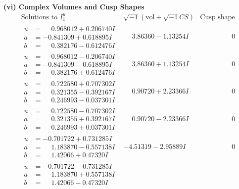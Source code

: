 \documentclass[1p]{elsarticle_modified}
\theoremstyle{definition}
\newcommand{\I}{\sqrt{-1}}
\begin{document}
\newpage\flushleft \textbf{(vi) Complex Volumes and Cusp Shapes}
$$\begin{array}{c|c|c}  
\text{Solutions to }I^u_{1}& \I (\text{vol} + \sqrt{-1}CS) & \text{Cusp shape}\\
 \hline 
\begin{aligned}
u &= \phantom{-}0.968012 + 0.206740 I \\
a &= -0.841309 + 0.618895 I \\
b &= \phantom{-}0.382176 - 0.612476 I\end{aligned}
 & \phantom{-}3.86360 - 1.13254 I & \phantom{-0.000000 } 0 \\ \hline\begin{aligned}
u &= \phantom{-}0.968012 - 0.206740 I \\
a &= -0.841309 - 0.618895 I \\
b &= \phantom{-}0.382176 + 0.612476 I\end{aligned}
 & \phantom{-}3.86360 + 1.13254 I & \phantom{-0.000000 } 0 \\ \hline\begin{aligned}
u &= \phantom{-}0.722580 + 0.707302 I \\
a &= \phantom{-}0.321355 - 0.392167 I \\
b &= \phantom{-}0.246993 - 0.037301 I\end{aligned}
 & \phantom{-}0.90720 + 2.23366 I & \phantom{-0.000000 } 0 \\ \hline\begin{aligned}
u &= \phantom{-}0.722580 - 0.707302 I \\
a &= \phantom{-}0.321355 + 0.392167 I \\
b &= \phantom{-}0.246993 + 0.037301 I\end{aligned}
 & \phantom{-}0.90720 - 2.23366 I & \phantom{-0.000000 } 0 \\ \hline\begin{aligned}
u &= -0.701722 + 0.731285 I \\
a &= \phantom{-}1.183870 - 0.557138 I \\
b &= \phantom{-}1.42066 + 0.47320 I\end{aligned}
 & -4.51319 - 2.95889 I & \phantom{-0.000000 } 0 \\ \hline\begin{aligned}
u &= -0.701722 - 0.731285 I \\
a &= \phantom{-}1.183870 + 0.557138 I \\
b &= \phantom{-}1.42066 - 0.47320 I\end{aligned}

\end{array}$$
\end{document}
